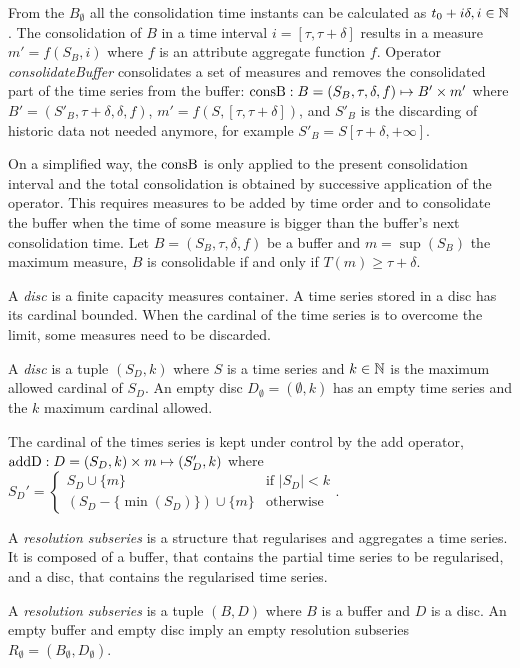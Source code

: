 From the $B_{\emptyset}$ all the consolidation time instants can be
calculated as $t_0+i\delta, i\in\mathbb{N}$. The consolidation of $B$ in a
time interval $i=[\tau,\tau+\delta]$ results in a measure
$m'=f(S_B,i)$ where $f$ is an attribute aggregate function
$f$. Operator \emph{consolidateBuffer} consolidates a set of measures
and removes the consolidated part of the time series from the buffer:
$\operatorname{consB} : B=(S_B,\tau,\delta,f) \mapsto B' \times m'$ where $ B'=
(S'_B,\tau+\delta,\delta,f)$, $m' = f(S,[\tau,\tau+\delta])$, and
$S'_B$ is the discarding of historic data not needed anymore, for example
$S'_B = S[\tau+\delta,+\infty]$.

On a simplified way, the $\operatorname{consB}$ is only applied to the present
consolidation interval and the total consolidation is obtained by
successive application of the operator. This requires measures to be
added by time order and to consolidate the buffer when the time of
some measure is bigger than the buffer's next consolidation time.  Let
$B=(S_B,\tau,\delta,f)$ be a buffer and $m=\sup(S_B)$ the maximum
measure, $B$ is consolidable if and only if $T(m) \geq
\tau+\delta$.


A \emph{disc} is a finite capacity measures container. A time series
stored in a disc has its cardinal bounded. When the cardinal of the
time series is to overcome the limit, some measures need to be
discarded.
\begin{definition}%
  A \emph{disc} is a tuple $(S_D,k)$ where $S$ is a time series and
  $k\in\mathbb{N}$ is the maximum allowed cardinal of $S_D$.  An empty
  disc $D_{\emptyset} = (\emptyset,k)$ has an empty time series and
  the $k$ maximum cardinal allowed.
\end{definition}

The cardinal of the times series is kept under control by the add
operator, $\operatorname{addD} : D=(S_D,k)\times m\mapsto (S'_D,k)$ where %
$
 S_D' = \begin{cases}
  S_D\cup\{m\}                 & \text{if } |S_D|<k  \\
  (S_D-\{\min(S_D)\}) \cup \{m\} & \text{otherwise}
\end{cases}  
$.


A \emph{resolution subseries} is a structure that regularises and
aggregates a time series. It is composed of a buffer, that contains
the partial time series to be regularised, and a disc, that contains
the regularised time series.
\begin{definition}%
  A \emph{resolution subseries} is a tuple $(B,D)$ where $B$ is a
  buffer and $D$ is a disc.  An empty buffer and empty disc imply an
  empty resolution subseries $R_{\emptyset} =
  (B_{\emptyset},D_{\emptyset})$.
\end{definition}
 
